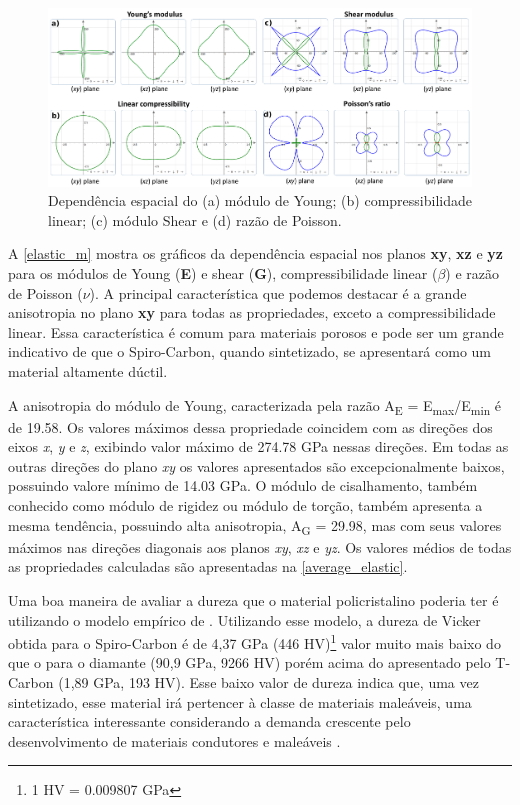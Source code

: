	
	\begin{figure}[!ht]
		\centering
		\includegraphics[width=1\linewidth]{capitulos/fig/elastic_2}
		\caption{Dependência espacial do (a) módulo de Young; (b) compressibilidade linear; (c) módulo Shear e (d) razão de Poisson.}
		\label{elastic_m}
	\end{figure}
	
	A \autoref{elastic_m} mostra os gráficos da dependência espacial nos planos \textbf{xy}, \textbf{xz} e \textbf{yz} para os módulos de Young (\textbf{E}) e shear  (\textbf{G}), compressibilidade linear  ($\beta$) e razão de Poisson ($\nu$). A principal característica que podemos destacar é a grande anisotropia no plano \textbf{xy} para todas as propriedades, exceto a compressibilidade linear. Essa característica é comum para materiais porosos \cite{ortiz2012anisotropic} e pode ser um grande indicativo de que o Spiro-Carbon, quando sintetizado, se apresentará como um material altamente dúctil. 
	
	A anisotropia do módulo de Young, caracterizada pela razão A\textsubscript{E} = E\textsubscript{max}/E\textsubscript{min} é de 19.58. Os valores máximos dessa propriedade coincidem com as direções dos eixos \textit{x}, \textit{y} e \textit{z}, exibindo valor máximo de 274.78 GPa nessas direções. Em todas as outras direções do plano \textit{xy} os valores apresentados são excepcionalmente baixos, possuindo valore mínimo de 14.03 GPa. O módulo de cisalhamento, também conhecido como módulo de rigidez ou módulo de torção, também apresenta a mesma tendência, possuindo alta anisotropia, A\textsubscript{G} = 29.98, mas com seus valores máximos nas direções diagonais aos planos \textit{xy}, \textit{xz} e \textit{yz}. Os valores médios de todas as propriedades calculadas são apresentadas na \autoref{average_elastic}.
	
	Uma boa maneira de avaliar a dureza que o material policristalino poderia ter é utilizando o modelo empírico de \citeauthor{chen2011modeling}. Utilizando esse modelo, a dureza de Vicker obtida para o Spiro-Carbon é de 4,37 GPa (446 HV)\footnote{1 HV = 0.009807 GPa} valor muito mais baixo do que o para o diamante (90,9 GPa, 9266 HV) porém acima do apresentado pelo T-Carbon (1,89 GPa, 193 HV). Esse baixo valor de dureza indica que, uma vez sintetizado, esse material irá pertencer à classe de materiais maleáveis, uma característica interessante considerando a demanda crescente pelo desenvolvimento de materiais condutores e maleáveis \cite{kim2008stretchable, valentine2017hybrid, gong2017one}.
	
